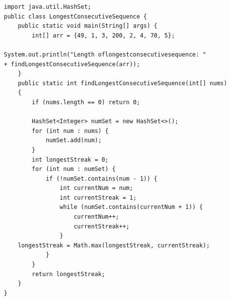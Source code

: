 \begin{verbatim}
import java.util.HashSet;
public class LongestConsecutiveSequence {
    public static void main(String[] args) {
        int[] arr = {49, 1, 3, 200, 2, 4, 70, 5};

System.out.println("Length oflongestconsecutivesequence: "
+ findLongestConsecutiveSequence(arr));
    }
    public static int findLongestConsecutiveSequence(int[] nums) 
    {
        if (nums.length == 0) return 0;

        HashSet<Integer> numSet = new HashSet<>();
        for (int num : nums) {
            numSet.add(num); 
        }
        int longestStreak = 0;
        for (int num : numSet) {
            if (!numSet.contains(num - 1)) {
                int currentNum = num;
                int currentStreak = 1;
                while (numSet.contains(currentNum + 1)) {
                    currentNum++;
                    currentStreak++;
                }
    longestStreak = Math.max(longestStreak, currentStreak);
            }
        }
        return longestStreak;
    }
}

\end{verbatim}
